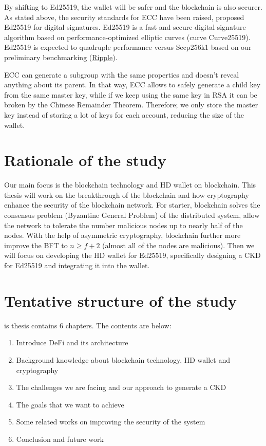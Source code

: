 By shifting to Ed25519, the wallet will be safer and the blockchain is also securer. As stated above, the security standards for ECC have been raised, proposed Ed25519 for digital signatures. Ed25519 is a fast and secure digital signature algorithm based on performance-optimized elliptic curves (curve Curve25519). Ed25519 is expected to quadruple performance versus Secp256k1 based on our preliminary benchmarking (\href{https://ripple.com/insights/curves-with-a-twist/}{Ripple}).

ECC can generate a subgroup with the same properties and doesn't reveal anything about its parent. In that way, ECC allows to safely generate a child key from the same master key, while if we keep using the same key in RSA it can be broken by the Chinese Remainder Theorem. Therefore; we only store the master key instead of storing a lot of keys for each account, reducing the size of the wallet.


\section{Rationale of the study}

Our main focus is the blockchain technology and HD wallet on blockchain. This thesis will work on the breakthrough of the blockchain and how cryptography enhance the security of the blockchain network. For starter, blockchain solves the consensus problem (Byzantine General Problem) of the distributed system, allow the network to tolerate the number malicious nodes up to nearly half of the nodes. With the help of asymmetric cryptography, blockchain further more improve the BFT to $n \geq f + 2$ (almost all of the nodes are malicious). Then we will focus on developing the HD wallet for Ed25519, specifically designing a CKD for Ed25519 and integrating it into the wallet.

\section{Tentative structure of the study}

is thesis contains 6 chapters. The contents are below:

\begin{enumerate}
  \item Introduce DeFi and its architecture
  \item Background knowledge about blockchain technology, HD wallet and cryptography
  \item The challenges we are facing and our approach to generate a CKD
  \item The goals that we want to achieve
  \item Some related works on improving the security of the system
  \item Conclusion and future work
\end{enumerate}

